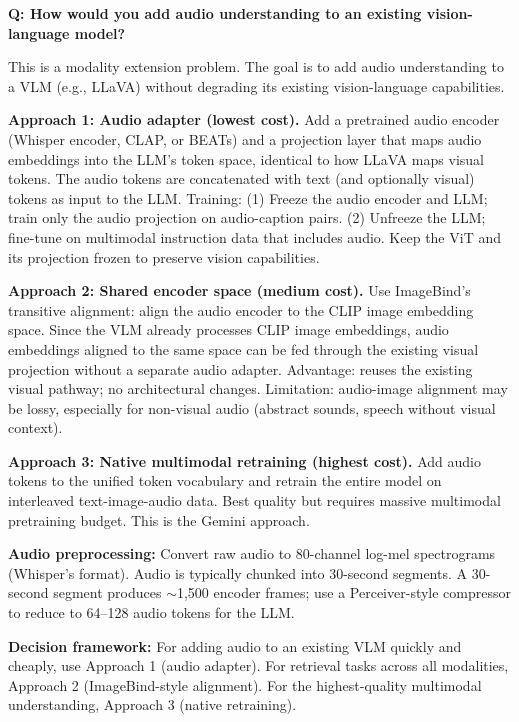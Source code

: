 \begin{interviewq}
\textbf{Q: How would you add audio understanding to an existing vision-language model?}

 \quad {} \quad \badgefreq{\freqlow}

\stronganswer

This is a modality extension problem. The goal is to add audio understanding to a VLM (e.g., LLaVA) without degrading its existing vision-language capabilities.

\textbf{Approach 1: Audio adapter (lowest cost).} Add a pretrained audio encoder (Whisper encoder, CLAP, or BEATs) and a projection layer that maps audio embeddings into the LLM's token space, identical to how LLaVA maps visual tokens. The audio tokens are concatenated with text (and optionally visual) tokens as input to the LLM. Training: (1) Freeze the audio encoder and LLM; train only the audio projection on audio-caption pairs. (2) Unfreeze the LLM; fine-tune on multimodal instruction data that includes audio. Keep the ViT and its projection frozen to preserve vision capabilities.

\textbf{Approach 2: Shared encoder space (medium cost).} Use ImageBind's transitive alignment: align the audio encoder to the CLIP image embedding space. Since the VLM already processes CLIP image embeddings, audio embeddings aligned to the same space can be fed through the existing visual projection without a separate audio adapter. Advantage: reuses the existing visual pathway; no architectural changes. Limitation: audio-image alignment may be lossy, especially for non-visual audio (abstract sounds, speech without visual context).

\textbf{Approach 3: Native multimodal retraining (highest cost).} Add audio tokens to the unified token vocabulary and retrain the entire model on interleaved text-image-audio data. Best quality but requires massive multimodal pretraining budget. This is the Gemini approach.

\textbf{Audio preprocessing:} Convert raw audio to 80-channel log-mel spectrograms (Whisper's format). Audio is typically chunked into 30-second segments. A 30-second segment produces $\sim$1,500 encoder frames; use a Perceiver-style compressor to reduce to 64--128 audio tokens for the LLM.

\textbf{Decision framework:} For adding audio to an existing VLM quickly and cheaply, use Approach 1 (audio adapter). For retrieval tasks across all modalities, Approach 2 (ImageBind-style alignment). For the highest-quality multimodal understanding, Approach 3 (native retraining).


\end{interviewq}
